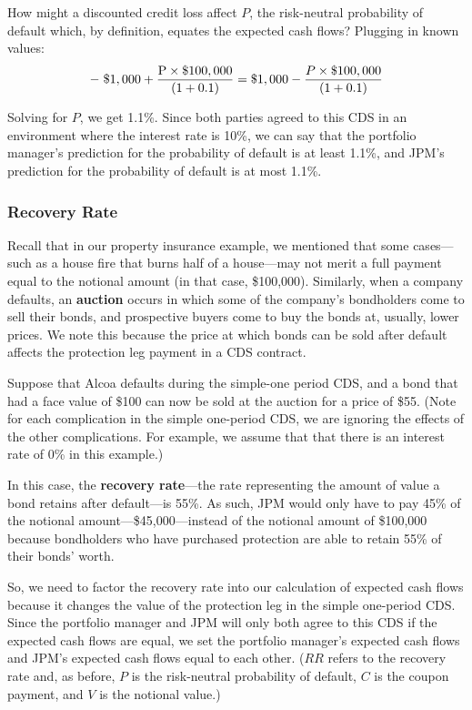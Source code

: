 \documentclass{jss}
\begin{document}
How might a discounted credit loss affect $P$, the risk-neutral probability of default which, by definition, equates the expected cash flows? Plugging in known values:
\begin{equation}
 \begin{aligned}
  {\rm -\hspace{3pt}\$1,000 + \frac{P \times \$100,000}{(1 + 0.1)} = \$1,000} - \frac{P \times \$100,000}{(1 + 0.1)} 
    \end{aligned}
\end{equation}

Solving for $P$, we get 1.1\%. Since both parties agreed to this CDS in an environment where the interest rate is 10\%, we can say that the portfolio manager's prediction for the probability of default is at least 1.1\%, and JPM's prediction for the probability of default is at most 1.1\%. 

\subsubsection{Recovery Rate}
\label{sec:recovery}

Recall that in our property insurance example, we mentioned that some cases---such as a house fire that burns half of a house---may not merit a full payment equal to the notional amount (in that case, \$100,000). Similarly, when a company defaults, an \textbf{auction} occurs in which some of the company's bondholders come to sell their bonds, and prospective buyers come to buy the bonds at, usually, lower prices. We note this because the price at which bonds can be sold after default affects the protection leg payment in a CDS contract.

Suppose that Alcoa defaults during the simple-one period CDS, and a bond that had a face value of \$100 can now be sold at the auction for a price of \$55. (Note for each complication in the simple one-period CDS, we are ignoring the effects of the other complications. For example, we assume that that there is an interest rate of 0\% in this example.)

In this case, the \textbf{recovery rate}---the rate representing the amount of value a bond retains after default---is 55\%. As such, JPM would only have to pay 45\% of the notional amount---\$45,000---instead of the notional amount of \$100,000 because bondholders who have purchased protection are able to retain 55\% of their bonds' worth. 

So, we need to factor the recovery rate into our calculation of expected cash flows because it changes the value of the protection leg in the simple one-period CDS. Since the portfolio manager and JPM will only both agree to this CDS if the expected cash flows are equal, we set the portfolio manager's expected cash flows and JPM's expected cash flows equal to each other. ($RR$ refers to the recovery rate and, as before, $P$ is the risk-neutral probability of default, $C$ is the coupon payment, and $V$ is the notional value.)
\end{document}
